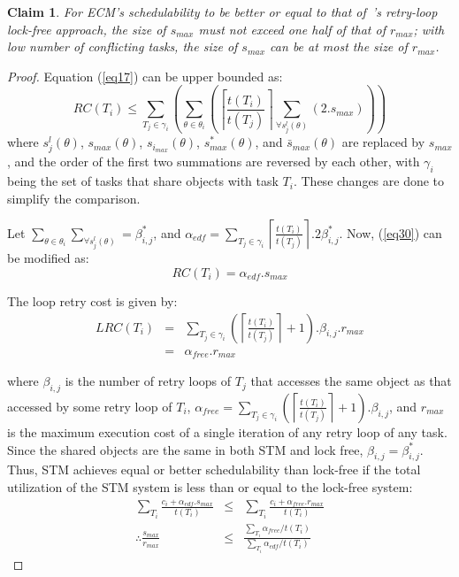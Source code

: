 \documentclass[a4paper,english]{article}
\newtheorem{clm}{Claim}
\newtheorem{proof}{Proof}
\begin{document}
\begin{clm}
For ECM's schedulability to be better or equal to that of~\cite{key-5}'s retry-loop lock-free approach,  
the size of $s_{max}$ must not exceed one half of that of $r_{max}$; with low number of conflicting tasks, the size of $s_{max}$ can be at most the size of $r_{max}$. 
\end{clm}
\begin{proof}\normalfont
Equation (\ref{eq17}) can be upper bounded as:
\begin{equation}
RC\left(T_{i}\right) \le \sum_{T_{j}\in\gamma_{i}}\left(\sum_{\theta\in\theta_{i}}\left(\left\lceil\frac{t\left(T_{i}\right)}{t\left(T_{j}\right)}\right\rceil\sum_{\forall s_{j}^{l}\left(\theta\right)}\left(2.s_{max}\right)\right)\right)
\label{eq30}
\end{equation}
where $s_{j}^{l}\left(\theta\right)$, $s_{max}\left(\theta\right)$, $s_{i_{max}}\left(\theta\right)$,
$s_{max}^{*}\left(\theta\right)$, and $\bar{s}_{max}\left(\theta\right)$ are replaced by $s_{max}$, and the order of the first two summations are reversed
by each other, 
with $\gamma_{i}$ being the set of tasks that share objects
with task $T_{i}$. These changes are done to simplify the comparison.

Let $\sum_{\theta\in\theta_{i}}\sum_{\forall s_{j}^{l}\left(\theta\right)}=\beta_{i,j}^{*}$, and $\alpha_{edf}=\sum_{T_{j}\in\gamma_{i}}\left\lceil\frac{t\left(T_{i}\right)}{t\left(T_{j}\right)}\right\rceil.2\beta_{i,j}^*$. Now, (\ref{eq30}) can be modified as:
\begin{equation}
RC\left(T_{i}\right)=\alpha_{edf}.s_{max}
\label{eq31}
\end{equation}

The loop retry cost is given by:
\begin{eqnarray}
LRC\left(T_i\right)&=&\sum_{T_{j}\in\gamma_{i}}\left(\left\lceil\frac{t\left(T_{i}\right)}{t\left(T_{j}\right)}\right\rceil+1\right).\beta_{i,j}.r_{max}\nonumber \\
&=& \alpha_{free} . r_{max} \label{eq32}
\end{eqnarray}

where $\beta_{i,j}$ is the number of retry loops of $T_{j}$ that accesses the same object as that accessed by some retry loop of $T_{i}$, $\alpha_{free} = \sum_{T_{j}\in\gamma_{i}}\left(\left\lceil\frac{t\left(T_{i}\right)}{t\left(T_{j}\right)}\right\rceil + 1 \right).\beta_{i,j}$, and $r_{max}$ is the maximum execution cost of a single iteration of any retry loop of any task.
Since the shared objects are the same in both STM and lock free, $\beta_{i,j}=\beta_{i,j}^{*}$.
Thus, STM achieves equal or better schedulability 
than lock-free if the total utilization of the STM system is less than or equal to the lock-free system:
\begin{eqnarray}
\sum_{T_{i}}\frac{c_{i}+\alpha_{edf}.s_{max}} {t\left(T_{i}\right)} & \le & \sum_{T_{i}}\frac{c_{i}+\alpha_{free}.r_{max}}{t\left(T_{i}\right)} \nonumber \\
\therefore\frac{s_{max}}{r_{max}} & \le & \frac{\sum_{T_{i}}\alpha_{free}/t\left(T_{i}\right)}{\sum_{T_{i}}\alpha_{edf}/t\left(T_{i}\right)}\end{eqnarray}



\end{proof}
\end{document}
